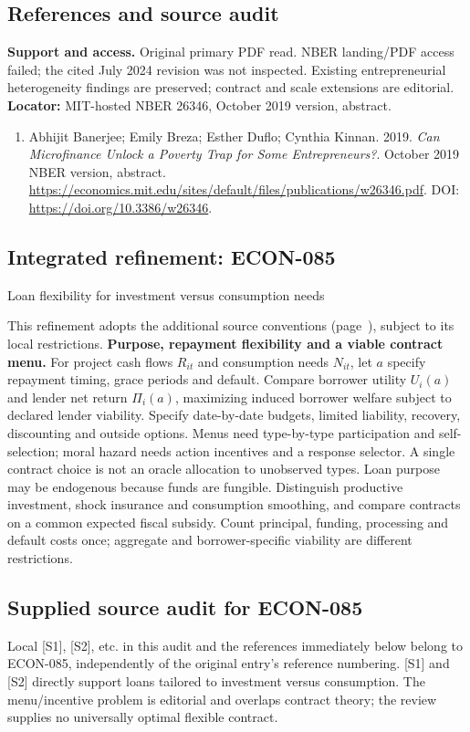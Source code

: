 \documentclass[11pt,a4paper]{article}
\begin{document}
\subsection*{References and source audit}
\textbf{Support and access.} Original primary PDF read. NBER landing/PDF access failed; the cited July 2024 revision was not inspected. Existing entrepreneurial heterogeneity findings are preserved; contract and scale extensions are editorial. \textbf{Locator:} MIT-hosted NBER 26346, October 2019 version, abstract.
\begin{enumerate}\raggedright
\item\hypertarget{definitions:source:30007655:1}{} Abhijit Banerjee; Emily Breza; Esther Duflo; Cynthia Kinnan. 2019. \emph{Can Microfinance Unlock a Poverty Trap for Some Entrepreneurs?}. October 2019 NBER version, abstract.
\url{https://economics.mit.edu/sites/default/files/publications/w26346.pdf}.
DOI: \url{https://doi.org/10.3386/w26346}.
\end{enumerate}

\subsection*{Integrated refinement: ECON-085}
{\sffamily\small\color{muted}Loan flexibility for investment versus consumption needs\par}
This refinement adopts the additional source conventions
(page~\pageref{audited:conventions}), subject to its local restrictions.
\textbf{Purpose, repayment flexibility and a viable contract menu.}
For project cash flows $R_{it}$ and consumption needs $N_{it}$, let $a$ specify
repayment timing, grace periods and default. Compare borrower utility $U_i(a)$
and lender net return $\Pi_i(a)$, maximizing induced borrower welfare subject to
declared lender viability. Specify date-by-date budgets, limited liability,
recovery, discounting and outside options. Menus need type-by-type participation
and self-selection; moral hazard needs action incentives and a response selector.
A single contract choice is not an oracle allocation to unobserved types.
Loan purpose may be endogenous because funds are fungible. Distinguish
productive investment, shock insurance and consumption smoothing, and compare
contracts on a common expected fiscal subsidy. Count principal, funding,
processing and default costs once; aggregate and borrower-specific viability
are different restrictions.
\subsection*{Supplied source audit for ECON-085}
Local [S1], [S2], etc. in this audit and the references immediately below
belong to ECON-085, independently of the original entry's reference numbering.
[S1] and [S2] directly support loans tailored to investment versus consumption. The menu/incentive problem is editorial and overlaps contract theory; the review supplies no universally optimal flexible contract.
\end{document}
